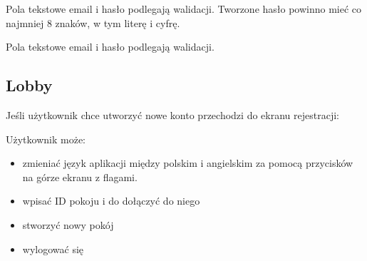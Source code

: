 \documentclass[12pt]{article}
\begin{document}
Pola tekstowe email i hasło podlegają walidacji. Tworzone hasło powinno mieć co najmniej 8 znaków, w tym literę i cyfrę.

Pola tekstowe email i hasło podlegają walidacji.

\newpage
\subsection{Lobby}
Jeśli użytkownik chce utworzyć nowe konto przechodzi do ekranu rejestracji:
\begin{figure}[!htb]
    \centering
    \centering
\end{figure}
Użytkownik może:
\begin{itemize}
    \item zmieniać język aplikacji między polskim i angielskim za pomocą przycisków na górze ekranu z flagami. 
    \item wpisać ID pokoju i do dołączyć do niego
    \item stworzyć nowy pokój
    \item wylogować się
\end{itemize}
\end{document}
